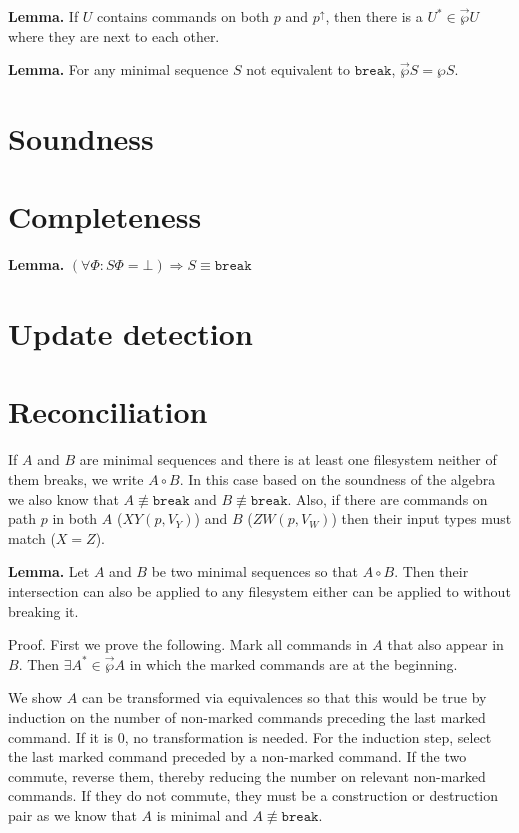 \documentclass[12pt]{article}
\newcommand{\empt}{\bot}
\newcommand{\FS}{\Phi} %
\newcommand{\pp}{p^\uparrow} %
\newcommand{\cbrk}{\mathtt{break}}
\newcommand{\fscommand}[2]{{#1#2}}
\newcommand{\cxy}{\fscommand{X}{Y}}
\newcommand{\czw}{\fscommand{Z}{W}}
\newcommand{\nequiv}{\not\equiv}
\newcommand{\extset}[1]{\wp{#1}}
\newcommand{\orderset}[1]{\vec{\wp}{#1}}
\begin{document}
{\bf Lemma.} If $U$ contains commands on both $p$ and $\pp$, then
there is a $U^*\in\orderset{U}$ where they are next to each other.

{\bf Lemma.} For any minimal sequence $S$ not equivalent to $\cbrk$,
$\orderset{S} = \extset{S}$.

\section{Soundness}

\section{Completeness}

{\bf Lemma.} \((\forall\FS: S\FS = \empt) \Rightarrow S \equiv \cbrk\)

\section{Update detection}

\section{Reconciliation}

If $A$ and $B$ are minimal sequences and there is at least one filesystem neither of them breaks,
we write $A\circ B$. In this case based on the soundness of the algebra
we also know that $A\nequiv\cbrk$ and $B\nequiv\cbrk$.
Also, if there are commands on path $p$ in both $A$ ($\cxy(p, V_Y)$) and $B$ ($\czw(p, V_W)$)
then their input types must match ($X=Z$).

{\bf Lemma.} Let $A$ and $B$ be two minimal sequences so that $A\circ B$.
Then their intersection can also be applied to any filesystem
either can be applied to without breaking it.

Proof.
First we prove the following.
Mark all commands in $A$ that also appear in $B$.
Then $\exists A^* \in \orderset{A}$ in which the marked commands are at the beginning.

We show $A$ can be transformed via equivalences so that this would be true
by induction on the number of non-marked commands preceding the last marked command.
If it is 0, no transformation is needed.
For the induction step, select the last marked command preceded by a non-marked command.
If the two commute, reverse them, thereby reducing the number on relevant non-marked commands.
If they do not commute, they must be a construction or destruction pair as we know
that $A$ is minimal and $A\nequiv\cbrk$.
\end{document}
